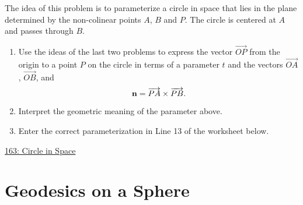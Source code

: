 \documentclass{ximera}
\begin{document}
\begin{question}  \label{Q9df43r23rfddfs}
The idea of this problem is to parameterize a circle in space that lies in the plane determined by the non-colinear points $A$, $B$ and $P$. The circle is centered at $A$ and passes through $B$.

\begin{enumerate}
\item{Use the ideas of the last two problems to express the vector $\overrightarrow{OP}$ from the origin to a point $P$ on the circle in terms of a parameter $t$ and the vectors $\overrightarrow{OA}$, $\overrightarrow{OB}$, and
\[
   {\bf n} = \overrightarrow{PA} \times \overrightarrow{PB} .
\]
}

\item{Interpret the geometric meaning of the parameter above.}

\item{Enter the correct parameterization in Line 13 of the worksheet below.}

\end{enumerate}


\begin{onlineOnly}
    \begin{center}
\end{center}
\end{onlineOnly}

\href{https://www.desmos.com/3d/4qvuqtp4lo}{163: Circle in Space}

\end{question}


\section{Geodesics on a Sphere}
\end{document}
